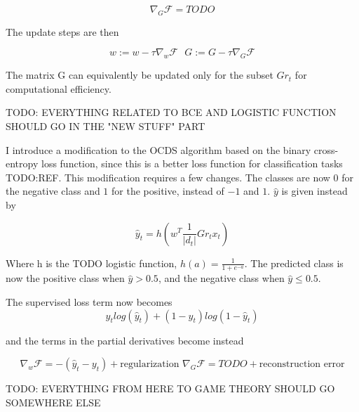 \begin{equation}
  \nabla_G \mathcal F = TODO
\end{equation}

The update steps are then

\begin{equation}
  w := w - \tau \nabla_w \mathcal F \,\,\,\, G := G - \tau \nabla_G \mathcal F
\end{equation}

The matrix G can equivalently be updated only for the subset $Gr_t$ for
computational efficiency.


TODO: EVERYTHING RELATED TO BCE AND LOGISTIC FUNCTION SHOULD GO IN THE "NEW STUFF" PART

I introduce a modification to the OCDS algorithm based on the binary
cross-entropy loss function, since this is a better loss function for
classification tasks TODO:REF. This modification requires a few changes. The
classes are now $0$ for the negative class and $1$ for the positive, instead of
$-1$ and $1$. $\hat y$ is given instead by

\begin{equation}
  \hat y_t =  h(w^T \frac {1}{|d_t|} Gr_t x_t)
\end{equation}

Where h is the TODO logistic function, $h(a) = \frac{1}{1+e^{-a}}$. The
predicted class is now the positive class when $\hat y>0.5$, and the negative
class when $\hat y \leq 0.5$.

The supervised loss term now becomes
\begin{equation}
  y_t log(\hat y_t) + (1-y_t) log (1-\hat y_t)
\end{equation}

and the terms in the partial derivatives become instead

\begin{equation}
  \nabla_w \mathcal F = -(\hat y_t - y_t) + \text{regularization} \,\, \nabla_G
  \mathcal F = TODO + \text{reconstruction error}
\end{equation}

TODO: EVERYTHING FROM HERE TO GAME THEORY SHOULD GO SOMEWHERE ELSE



